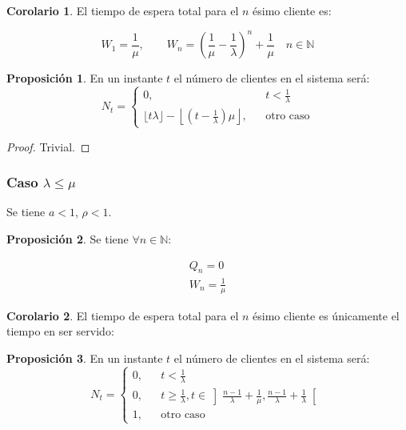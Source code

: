 \documentclass[a4paper,10pt]{scrartcl}
\theoremstyle{definition}
\newtheorem*{fact}{Proposición}
\newtheorem*{corollary}{Corolario}
\numberwithin{equation}{section}
\begin{document}
\begin{corollary}
 El tiempo de espera total para el $n$ ésimo cliente es:
 
 \[W_1 = \frac{1}{\mu}, \qquad W_n = \left(\frac{1}{\mu} - \frac{1}{\lambda}\right)^n + \frac{1}{\mu} \quad n\in \mathbb{N}\]
\end{corollary}

\begin{fact}
 En un instante $t$ el número de clientes en el sistema será: 
 \[N_t = \left\{\begin{array}{lcc}
         0, && t < \frac{1}{\lambda}\\
         \lfloor t\lambda \rfloor - \left\lfloor\left(t-\frac{1}{\lambda}\right)\mu\right\rfloor, && \text{otro caso}
         \end{array}\right.\]
\end{fact}

\begin{proof}
 Trivial.
\end{proof}


\subsubsection{Caso $\lambda \le \mu$}

Se tiene $a < 1$, $\rho < 1$.

\begin{fact}
Se tiene $\forall n\in \mathbb{N}$:

\begin{align*}
Q_n = 0\\
W_n = \frac{1}{\mu}
\end{align*}
\end{fact}

\begin{corollary}
 El tiempo de espera total para el $n$ ésimo cliente es únicamente el tiempo en ser servido:
 
 
\end{corollary}

\begin{fact}
 En un instante $t$ el número de clientes en el sistema será: 
 \[N_t = \left\{\begin{array}{lcc}
          0, && t < \frac{1}{\lambda}\\
          0, && t \ge \frac{1}{\lambda}, t \in \left]\frac{n-1}{\lambda} + \frac{1}{\mu}, \frac{n-1}{\lambda} + \frac{1}{\lambda}\right[\\
          1, && \text{otro caso}
         \end{array}\right.\]
\end{fact}
\end{document}
